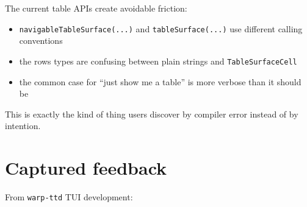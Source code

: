 The current table APIs create avoidable friction:

\begin{itemize}
\tightlist
\item
  \texttt{n\allowbreak{}a\allowbreak{}v\allowbreak{}i\allowbreak{}g\allowbreak{}a\allowbreak{}b\allowbreak{}l\allowbreak{}e\allowbreak{}T\allowbreak{}a\allowbreak{}b\allowbreak{}l\allowbreak{}e\allowbreak{}S\allowbreak{}u\allowbreak{}r\allowbreak{}f\allowbreak{}a\allowbreak{}c\allowbreak{}e\allowbreak{}(\allowbreak{}.\allowbreak{}.\allowbreak{}.\allowbreak{})} and \texttt{t\allowbreak{}a\allowbreak{}b\allowbreak{}l\allowbreak{}e\allowbreak{}S\allowbreak{}u\allowbreak{}r\allowbreak{}f\allowbreak{}a\allowbreak{}c\allowbreak{}e\allowbreak{}(\allowbreak{}.\allowbreak{}.\allowbreak{}.\allowbreak{})} use different calling conventions
\item
  the rows types are confusing between plain strings and \texttt{T\allowbreak{}a\allowbreak{}b\allowbreak{}l\allowbreak{}e\allowbreak{}S\allowbreak{}u\allowbreak{}r\allowbreak{}f\allowbreak{}a\allowbreak{}c\allowbreak{}e\allowbreak{}C\allowbreak{}e\allowbreak{}l\allowbreak{}l}
\item
  the common case for ``just show me a table'' is more verbose than it should be
\end{itemize}

This is exactly the kind of thing users discover by compiler error instead of by intention.

\section{Captured feedback}\label{record-335-captured-feedback}

From \texttt{w\allowbreak{}a\allowbreak{}r\allowbreak{}p\allowbreak{}-\allowbreak{}t\allowbreak{}t\allowbreak{}d} TUI development:

